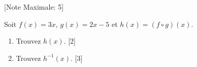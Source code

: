 \begin{question}
  \hspace*{\fill} [Note Maximale: 5]\par
  \medskip
  \noindent Soit $f(x)=3x$, $g(x)=2x - 5$ et $h(x) = (f \circ g)(x)$.\par
  \begin{enumerate}[label=(\alph*)]
    \item Trouvez $h(x)$.\hspace*{\fill} [2]
    \item Trouvez $h^{-1}(x)$.\hspace*{\fill} [3]
  \end{enumerate}
\end{question}
